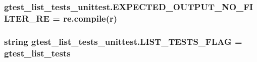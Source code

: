 \subsubsection[{\texorpdfstring{E\+X\+P\+E\+C\+T\+E\+D\+\_\+\+O\+U\+T\+P\+U\+T\+\_\+\+N\+O\+\_\+\+F\+I\+L\+T\+E\+R\+\_\+\+RE}{EXPECTED_OUTPUT_NO_FILTER_RE}}]{\setlength{\rightskip}{0pt plus 5cm}gtest\+\_\+list\+\_\+tests\+\_\+unittest.\+E\+X\+P\+E\+C\+T\+E\+D\+\_\+\+O\+U\+T\+P\+U\+T\+\_\+\+N\+O\+\_\+\+F\+I\+L\+T\+E\+R\+\_\+\+RE = re.\+compile(r)}\hypertarget{namespacegtest__list__tests__unittest_a29efbf77d2682ce359327e2e7dbd1c46}{}\label{namespacegtest__list__tests__unittest_a29efbf77d2682ce359327e2e7dbd1c46}
\subsubsection[{\texorpdfstring{L\+I\+S\+T\+\_\+\+T\+E\+S\+T\+S\+\_\+\+F\+L\+AG}{LIST_TESTS_FLAG}}]{\setlength{\rightskip}{0pt plus 5cm}string gtest\+\_\+list\+\_\+tests\+\_\+unittest.\+L\+I\+S\+T\+\_\+\+T\+E\+S\+T\+S\+\_\+\+F\+L\+AG = \textquotesingle{}gtest\+\_\+list\+\_\+tests\textquotesingle{}}\hypertarget{namespacegtest__list__tests__unittest_a658d9ea18c57a13a25d0cce73d314e7a}{}\label{namespacegtest__list__tests__unittest_a658d9ea18c57a13a25d0cce73d314e7a}
